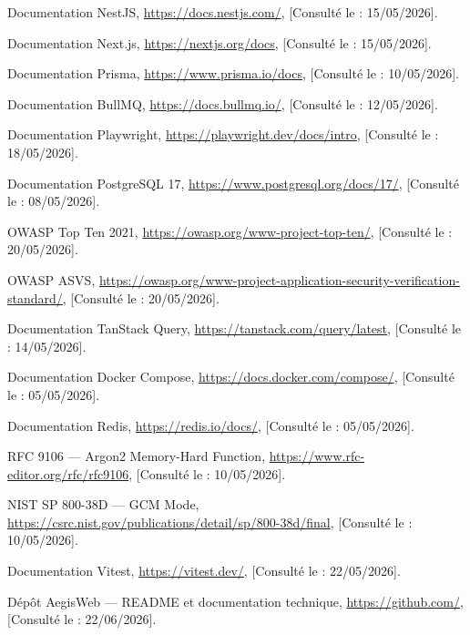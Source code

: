 \begin{enumerate}[label={[\arabic*]}, leftmargin=1.8cm, itemsep=5pt,
  resume]

  \item Documentation NestJS,
    \url{https://docs.nestjs.com/},
    [Consulté le : 15/05/2026].

  \item Documentation Next.js,
    \url{https://nextjs.org/docs},
    [Consulté le : 15/05/2026].

  \item Documentation Prisma,
    \url{https://www.prisma.io/docs},
    [Consulté le : 10/05/2026].

  \item Documentation BullMQ,
    \url{https://docs.bullmq.io/},
    [Consulté le : 12/05/2026].

  \item Documentation Playwright,
    \url{https://playwright.dev/docs/intro},
    [Consulté le : 18/05/2026].

  \item Documentation PostgreSQL 17,
    \url{https://www.postgresql.org/docs/17/},
    [Consulté le : 08/05/2026].

  \item OWASP Top Ten 2021,
    \url{https://owasp.org/www-project-top-ten/},
    [Consulté le : 20/05/2026].

  \item OWASP ASVS,
    \url{https://owasp.org/www-project-application-security-verification-standard/},
    [Consulté le : 20/05/2026].

  \item Documentation TanStack Query,
    \url{https://tanstack.com/query/latest},
    [Consulté le : 14/05/2026].

  \item Documentation Docker Compose,
    \url{https://docs.docker.com/compose/},
    [Consulté le : 05/05/2026].

  \item Documentation Redis,
    \url{https://redis.io/docs/},
    [Consulté le : 05/05/2026].

  \item RFC 9106 — Argon2 Memory-Hard Function,
    \url{https://www.rfc-editor.org/rfc/rfc9106},
    [Consulté le : 10/05/2026].

  \item NIST SP 800-38D — GCM Mode,
    \url{https://csrc.nist.gov/publications/detail/sp/800-38d/final},
    [Consulté le : 10/05/2026].

  \item Documentation Vitest,
    \url{https://vitest.dev/},
    [Consulté le : 22/05/2026].

  \item Dépôt AegisWeb — README et documentation technique,
    \url{https://github.com/},
    [Consulté le : 22/06/2026].

\end{enumerate}
